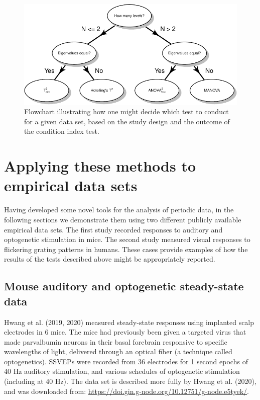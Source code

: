 \documentclass[]{article}
\begin{document}
\begin{figure}

{\centering \includegraphics{manuscript_files/figure-latex/flowchart-1} 

}

\caption{Flowchart illustrating how one might decide which test to conduct for a given data set, based on the study design and the outcome of the condition index test.}\label{fig:flowchart}
\end{figure}

\hypertarget{applying-these-methods-to-empirical-data-sets}{%
\section{Applying these methods to empirical data sets}\label{applying-these-methods-to-empirical-data-sets}}

Having developed some novel tools for the analysis of periodic data, in the following sections we demonstrate them using two different publicly available empirical data sets. The first study recorded responses to auditory and optogenetic stimulation in mice. The second study measured visual responses to flickering grating patterns in humans. These cases provide examples of how the results of the tests described above might be appropriately reported.

\hypertarget{mouse-auditory-and-optogenetic-steady-state-data}{%
\subsection{Mouse auditory and optogenetic steady-state data}\label{mouse-auditory-and-optogenetic-steady-state-data}}

Hwang et al. (2019, 2020) measured steady-state responses using implanted scalp electrodes in 6 mice. The mice had previously been given a targeted virus that made parvalbumin neurons in their basal forebrain responsive to specific wavelengths of light, delivered through an optical fiber (a technique called optogenetics). SSVEPs were recorded from 36 electrodes for 1 second epochs of 40 Hz auditory stimulation, and various schedules of optogenetic stimulation (including at 40 Hz). The data set is described more fully by Hwang et al. (2020), and was downloaded from: \url{https://doi.gin.g-node.org/10.12751/g-node.e5tyek/}.
\end{document}
